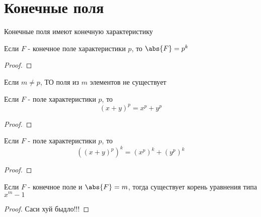 \documentclass[../main/document.tex]{subfiles}
\begin{document}
\section{Конечные поля}

\begin{dfn}

\end{dfn}

\begin{cnsq}
Конечные поля имеют конечную характеристику
\end{cnsq}

\begin{thm}
Если $F$ - конечное поле характеристики $p$, то $\abs{F}=p^k$
\begin{proof}

\end{proof}
\end{thm}
\begin{cnsq}
Если $m\neq p$, ТО поля из $m$ элементов не существует
\end{cnsq}
\begin{thm}
Если $F$ - поле характеристики $p$, то
$$(x+y)^p=x^p+y^p$$
\begin{proof}

\end{proof}
\end{thm}
\begin{thm}
Если $F$ - поле характеристики $p$, то
$$({(x+y)^p})^k=({x^p})^k+({y^p})^k$$
\begin{proof}

\end{proof}
\end{thm}
\begin{thm}
Если $F$ - конечное поле и $\abs{F}=m$, тогда существует корень уравнения типа $x^m-1$
\begin{proof}
Саси хуй быдло!!!
\end{proof}
\end{thm}
\end{document}
